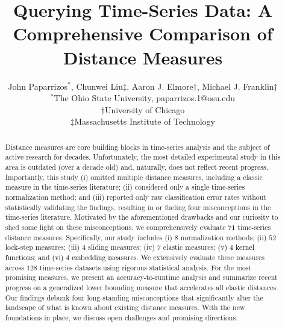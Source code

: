 \documentclass[11pt]{article}
\begin{document}
\title{Querying Time-Series Data: A Comprehensive Comparison of Distance Measures}

\author{John Paparrizos$^*$, Chunwei Liu$\ddagger$, Aaron J. Elmore$\dagger$, Michael J. Franklin$\dagger$\\
  $^*$The Ohio State University, paparrizos.1@osu.edu \\
  $\dagger$University of Chicago \\
  $\ddagger$Massachusetts Institute of Technology\\
}


\maketitle
\renewcommand\thesection{\arabic{section}}
\setcounter{section}{0}
\setcounter{figure}{0}
\setcounter{table}{0}

\begin{abstract}
Distance measures are core building blocks in time-series analysis and the subject of active research for decades. Unfortunately, the most detailed experimental study in this area is outdated (over a decade old) and, naturally, does not reflect recent progress. Importantly, this study (i) omitted multiple distance measures, including a classic measure in the time-series literature; (ii) considered only a single time-series normalization method; and (iii) reported only raw classification error rates without statistically validating the findings, resulting in or fueling four misconceptions in the time-series literature. Motivated by the aforementioned drawbacks and our curiosity to shed some light on these misconceptions, we comprehensively evaluate \textcolor{black}{$71$} time-series distance measures. Specifically, our study includes (i) $8$ normalization methods; (ii) $52$ lock-step measures; (iii) $4$ sliding measures; (iv) $7$ elastic measures; \textcolor{black}{(v) $4$ kernel functions; and (vi) $4$ embedding measures}. We extensively evaluate these measures across $128$ time-series datasets using rigorous statistical analysis. For the most promising measures, we present an accuracy-to-runtime analysis and summarize recent progress on a generalized lower bounding measure that accelerates all elastic distances. Our findings debunk four long-standing misconceptions that significantly alter the landscape of what is known about existing distance measures. With the new foundations in place, we discuss open challenges and promising directions.
\end{abstract}
\end{document}
